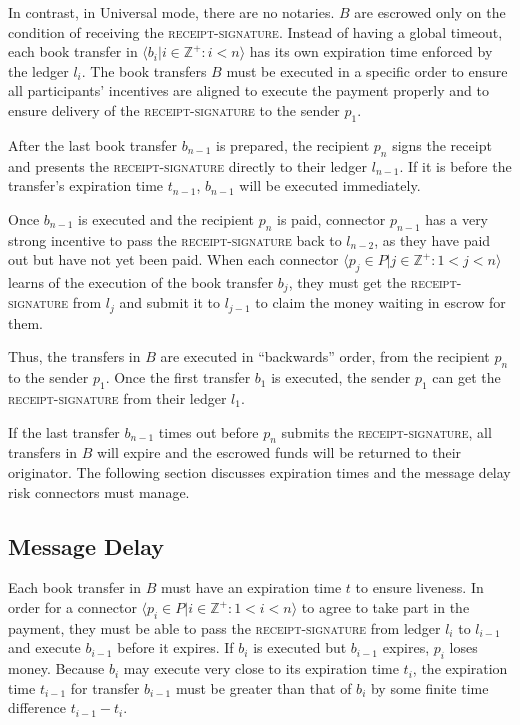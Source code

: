 \documentclass[letterpaper,twocolumn,10pt]{article}
\begin{document}
In contrast, in Universal mode, there are no notaries. $B$ are escrowed only on the condition of receiving the \textsc{receipt-signature}. Instead of having a global timeout, each book transfer in $ \langle b_i | i \in \mathbb{Z}^+ : i < n \rangle $ has its own expiration time enforced by the ledger $l_i$. The book transfers $B$ must be executed in a specific order to ensure all participants' incentives are aligned to execute the payment properly and to ensure delivery of the \textsc{receipt-signature} to the sender $p_1$.

After the last book transfer $b_{n-1}$ is prepared, the recipient $p_n$ signs the receipt and presents the \textsc{receipt-signature} directly to their ledger $l_{n-1}$. If it is before the transfer's expiration time $t_{n-1}$, $b_{n-1}$ will be executed immediately.

Once $b_{n-1}$ is executed and the recipient $p_n$ is paid, connector $p_{n-1}$ has a very strong incentive to pass the \textsc{receipt-signature} back to $l_{n-2}$, as they have paid out but have not yet been paid. When each connector $ \langle p_j \in P | j \in \mathbb{Z}^+ : 1 < j < n \rangle $ learns of the execution of the book transfer $b_j$, they must get the \textsc{receipt-signature} from $l_j$ and submit it to $l_{j-1}$ to claim the money waiting in escrow for them. 

Thus, the transfers in $B$ are executed in ``backwards'' order, from the recipient $p_n$ to the sender $p_1$. Once the first transfer $b_1$ is executed, the sender $p_1$ can get the \textsc{receipt-signature} from their ledger $l_1$.

If the last transfer $b_{n-1}$ times out before $p_n$ submits the \textsc{receipt-signature}, all transfers in $B$ will expire and the escrowed funds will be returned to their originator. The following section discusses expiration times and the message delay risk connectors must manage.


\subsection{Message Delay}
\label{subsec:message-delay}



Each book transfer in $B$ must have an expiration time $t$ to ensure liveness. In order for a connector $ \langle p_i \in P | i \in \mathbb{Z}^+ : 1 < i < n \rangle $ to agree to take part in the payment, they must be able to pass the \textsc{receipt-signature} from ledger $l_i$ to $l_{i-1}$ and execute $b_{i-1}$ before it expires. If $b_i$ is executed but $b_{i-1}$ expires, $p_i$ loses money. Because $b_i$ may execute very close to its expiration time $t_i$, the expiration time $t_{i-1}$ for transfer $b_{i-1}$ must be greater than that of $b_i$ by some finite time difference $t_{i-1} - t_i$.
\end{document}
